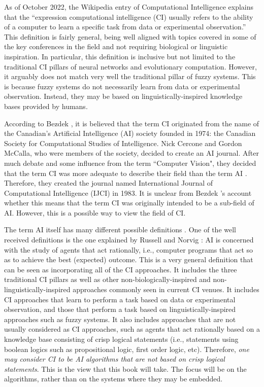 As of October 2022, the Wikipedia entry of Computational Intelligence \cite{ciswiki} explains that the ``expression computational intelligence (CI) usually refers to the ability of a computer to learn a specific task from data or experimental observation.'' This definition is fairly general, being well aligned with topics covered in some of the key conferences in the field and not requiring biological or linguistic inspiration. In particular, this definition is inclusive but not limited to the traditional CI pillars of neural networks and evolutionary computation. However, it arguably does not match very well the traditional pillar of fuzzy systems. This is because fuzzy systems do not necessarily learn from data or experimental observation. Instead, they may be based on linguistically-inspired knowledge bases provided by humans. 

According to Bezdek \cite{Bezdek}, it is believed that the term CI originated from the name of the Canadian's Artificial Intelligence (AI) society founded in 1974: the Canadian Society for Computational Studies of Intelligence. Nick Cercone and Gordon McCalla, who were members of the society, decided to create an AI journal. After much debate and some influence from the term ``Computer Vision", they decided that the term CI was more adequate to describe their field than the term AI \cite{Bezdek}. Therefore, they created the journal named International Journal of Computational Intelligence (IJCI) in 1983. It is unclear from Bezdek \cite{Bezdek}'s account whether this means that the term CI was originally intended to be a sub-field of AI. However, this is a possible way to view the field of CI.

The term AI itself has many different possible definitions \cite{RussellNorvig}. One of the well received definitions is the one explained by Russell and Norvig \cite{RussellNorvig}: AI is concerned with the study of agents that act rationally, i.e., computer programs that act so as to achieve the best (expected) outcome. This is a very general definition that can be seen as incorporating all of the CI approaches. It includes the three traditional CI pillars as well as other non-biologically-inspired and non-linguistically-inspired approaches commonly seen in current CI venues. It includes CI approaches that learn to perform a task based on data or experimental observation, and those that perform a task based on linguistically-inspired approaches such as fuzzy systems.  It also includes approaches that are not usually considered as CI approaches, such as agents that act rationally based on a knowledge base consisting of crisp logical statements (i.e., statements using boolean logics such as propositional logic, first order logic, etc). Therefore, \textit{one may consider CI to be AI algorithms that are not based on crisp logical statements}. This is the view that this book will take. The focus will be on the algorithms, rather than on the systems where they may be embedded.

